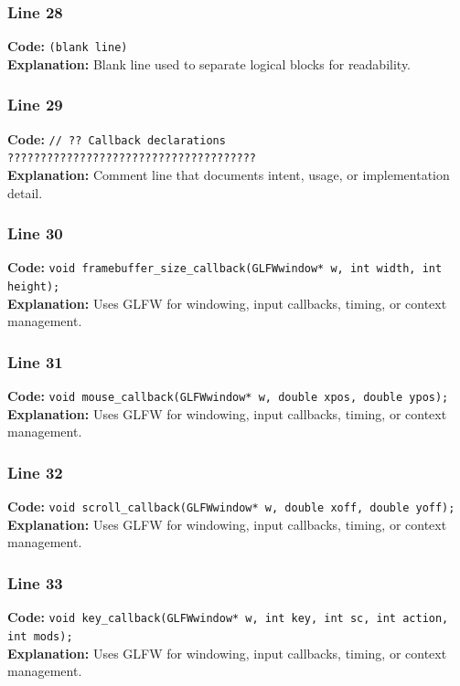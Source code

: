 \documentclass[11pt,a4paper]{article}
\begin{document}
\subsubsection*{Line 28}
\textbf{Code:} \texttt{(blank line)}\\
\textbf{Explanation:} Blank line used to separate logical blocks for readability.

\subsubsection*{Line 29}
\textbf{Code:} \verb|// ?? Callback declarations ??????????????????????????????????????|\\
\textbf{Explanation:} Comment line that documents intent, usage, or implementation detail.

\subsubsection*{Line 30}
\textbf{Code:} \verb|void framebuffer_size_callback(GLFWwindow* w, int width, int height);|\\
\textbf{Explanation:} Uses GLFW for windowing, input callbacks, timing, or context management.

\subsubsection*{Line 31}
\textbf{Code:} \verb|void mouse_callback(GLFWwindow* w, double xpos, double ypos);|\\
\textbf{Explanation:} Uses GLFW for windowing, input callbacks, timing, or context management.

\subsubsection*{Line 32}
\textbf{Code:} \verb|void scroll_callback(GLFWwindow* w, double xoff, double yoff);|\\
\textbf{Explanation:} Uses GLFW for windowing, input callbacks, timing, or context management.

\subsubsection*{Line 33}
\textbf{Code:} \verb|void key_callback(GLFWwindow* w, int key, int sc, int action, int mods);|\\
\textbf{Explanation:} Uses GLFW for windowing, input callbacks, timing, or context management.
\end{document}
